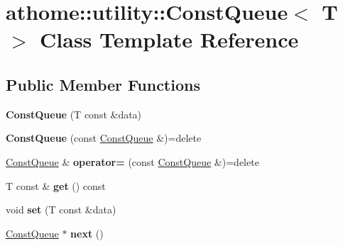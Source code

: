 \hypertarget{classathome_1_1utility_1_1_const_queue}{}\section{athome\+:\+:utility\+:\+:Const\+Queue$<$ T $>$ Class Template Reference}
\label{classathome_1_1utility_1_1_const_queue}
\subsection*{Public Member Functions}
\begin{DoxyCompactItemize}
\item 
\mbox{\label{classathome_1_1utility_1_1_const_queue_a08a8cb39eb235aa6c81b9db0ae4faa9a}} 
{\bfseries Const\+Queue} (T const \&data)
\item 
\mbox{\label{classathome_1_1utility_1_1_const_queue_a806d84f9d2b2bd5e8ed096d5c0d0fcf5}} 
{\bfseries Const\+Queue} (const \mbox{\hyperlink{classathome_1_1utility_1_1_const_queue}{Const\+Queue}} \&)=delete
\item 
\mbox{\label{classathome_1_1utility_1_1_const_queue_ae397223294153cf26d83b5b39f3971a6}} 
\mbox{\hyperlink{classathome_1_1utility_1_1_const_queue}{Const\+Queue}} \& {\bfseries operator=} (const \mbox{\hyperlink{classathome_1_1utility_1_1_const_queue}{Const\+Queue}} \&)=delete
\item 
\mbox{\label{classathome_1_1utility_1_1_const_queue_af6048096156d62321afe9d636d619f46}} 
T const  \& {\bfseries get} () const
\item 
\mbox{\label{classathome_1_1utility_1_1_const_queue_a43ecd9bb07d85dc68267a33b452e1517}} 
void {\bfseries set} (T const \&data)
\item 
\mbox{\label{classathome_1_1utility_1_1_const_queue_ad176966c613aaf7ac2bd9c50496e68f1}} 
\mbox{\hyperlink{classathome_1_1utility_1_1_const_queue}{Const\+Queue}} $\ast$ {\bfseries next} ()
\item 

\end{DoxyCompactItemize}
